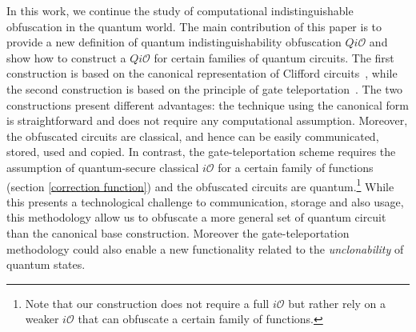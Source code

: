In this work, we continue the study of computational indistinguishable obfuscation in the quantum world. The main contribution of this paper is to provide a new definition of quantum indistinguishability obfuscation $Qi\mathcal{O}$ and show how to construct a $Qi\mathcal{O}$ for certain families of quantum circuits. The first construction is based on the canonical representation of Clifford circuits~\cite{AG04}, while the second construction is based on the principle of gate teleportation~\cite{GC99}. The two constructions present different advantages: the technique using the canonical form is straightforward and does not require any computational assumption. Moreover, the obfuscated circuits are classical, and hence can be easily communicated, stored, used and copied.  In contrast, the gate-teleportation scheme requires the assumption of quantum-secure classical $i\mathcal{O}$ for a certain family of functions (section \ref{correction function}) and the obfuscated circuits are quantum.\footnote{Note that our construction does not require a full $i\mathcal{O}$ but rather rely on a weaker $i\mathcal{O}$ that can obfuscate a certain family of functions.} While this presents a technological challenge to communication, storage and also usage, this methodology allow us to obfuscate a more general set of quantum circuit than the canonical base construction. Moreover the gate-teleportation methodology could also enable a new functionality related to the \emph{unclonability} of quantum states.

